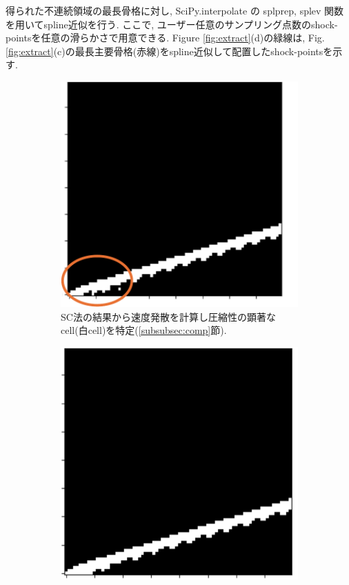 \documentclass[a4j]{jarticle}
\begin{document}
得られた不連続領域の最長骨格に対し, 
\textsf{SciPy}\allowbreak\textsf{.interpolate} の \textsf{splprep}, \textsf{splev} 関数を用いてspline近似を行う.
ここで, ユーザー任意のサンプリング点数のshock-pointsを任意の滑らかさで用意できる.
Figure \ref{fig:extract}(d)の緑線は, Fig.\ref{fig:extract}(c)の最長主要骨格(赤線)をspline近似して配置したshock-pointsを示す.
\begin{figure}[h]
  \centering
  \begin{subfigure}[t]{0.235\textwidth}
    \centering
    \includegraphics[width=\linewidth]{extracta.pdf}
    \caption{SC法の結果から速度発散を計算し圧縮性の顕著なcell(白cell)を特定(\ref{subsubsec:comp}節).}
  \end{subfigure}
  \hfill
  \begin{subfigure}[t]{0.23\textwidth}
    \centering
    \includegraphics[width=\linewidth]{extractb.pdf}

\end{subfigure}
\end{figure}
\end{document}
